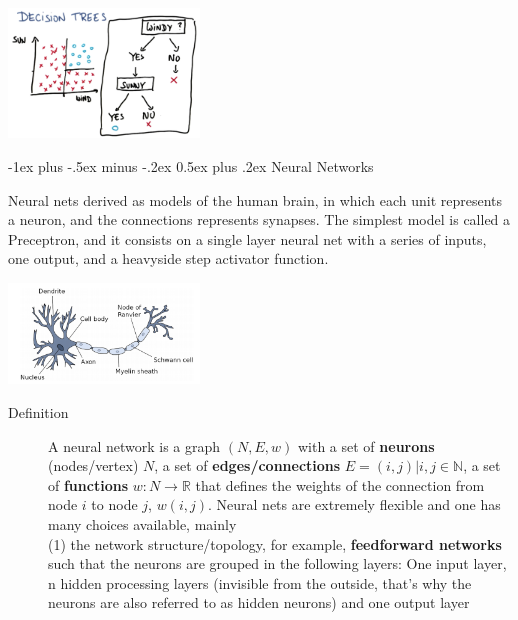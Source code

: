 \documentclass[10pt,landscape]{article}
\makeatletter
\renewcommand{\section}{\@startsection{section}{1}{0mm}%
                                {-1ex plus -.5ex minus -.2ex}%
                                {0.5ex plus .2ex}%
                                {\normalfont\large\bfseries}}
\makeatother
\begin{document}
\begin{multicols*}{3}
\begin{description}
    \begin{minipage}{\linewidth}
        \centering
        \includegraphics[width=2in]{figures/dtexample.png}
    \end{minipage}

    \end{description}

\section{Neural Networks}

Neural nets derived as models of the human brain, in which each unit represents a neuron, and the connections
represents synapses.  The simplest model is called a Preceptron, and it consists on a single layer neural net with
a series of inputs, one output, and a heavyside step activator function.

\begin{minipage}{\linewidth}
    \centering
    \includegraphics[width=2in]{figures/nnbio.png}
\end{minipage}


\begin{description}

\item[Definition] A neural network is a graph $(N,E,w)$ with a set of \textbf{neurons} (nodes/vertex) $N$,
a set of \textbf{edges/connections} $E={(i,j)|i,j\in\mathbb{N}}$,
a set of \textbf{functions} $w:N\rightarrow\mathbb{R}$ that defines the weights of the connection
from node $i$ to node $j$, $w(i,j)$.
Neural nets are extremely flexible and one has many choices available, mainly \\
(1) the network structure/topology, for example,
\textbf{feedforward networks} such that the neurons are grouped in the following layers:
One input layer, n hidden processing layers (invisible from the outside, that’s why the neurons
are also referred to as hidden neurons) and one output layer


\end{description}
\end{multicols*}
\end{document}
